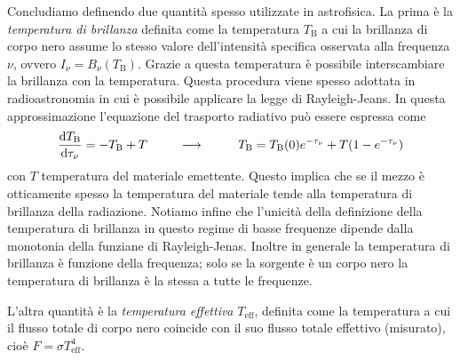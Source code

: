 Concludiamo definendo due quantità spesso utilizzate in astrofisica. La prima è la \textit{temperatura di brillanza} definita come la temperatura $T_\mathrm{B}$ a cui la brillanza di corpo nero assume lo stesso valore dell'intensità specifica osservata alla frequenza $\nu$, ovvero $I_\nu = B_\nu(T_\mathrm{B})$. Grazie a questa temperatura è possibile interscambiare la brillanza con la temperatura. Questa procedura viene spesso adottata in radioastronomia in cui è possibile applicare la legge di Rayleigh-Jeans. In questa approssimazione l'equazione del trasporto radiativo può essere espressa come
\begin{equation}
\dfrac{\mathrm{d} {T_\mathrm{B}}}{\mathrm{d} {\tau_\nu}} = - T_\mathrm{B} + T \,\,\,\,\,\,\,\,\,\,\,\,\,\,\,\longrightarrow \,\,\,\,\,\,\,\,\,\,\,\,\,\,\ T_\mathrm{B} = T_\mathrm{B}(0)e^{-\tau_\nu} + T(1-e^{-\tau_\nu})
\end{equation}
con $T$ temperatura del materiale emettente. Questo implica che se il mezzo è otticamente spesso la temperatura del materiale tende alla temperatura di brillanza della radiazione. Notiamo infine che l'unicità della definizione della temperatura di brillanza in questo regime di basse frequenze dipende dalla monotonia della funziane di Rayleigh-Jenas. Inoltre in generale la temperatura di brillanza è funzione della frequenza; solo se la sorgente è un corpo nero la temperatura di brillanza è la stessa a tutte le frequenze.

L'altra quantità è la \textit{temperatura effettiva} $T_\mathrm{eff}$, definita come la temperatura a cui il flusso totale di corpo nero coincide con il suo flusso totale effettivo (misurato), cioè $F=\sigma T_\mathrm{eff}^4$.


